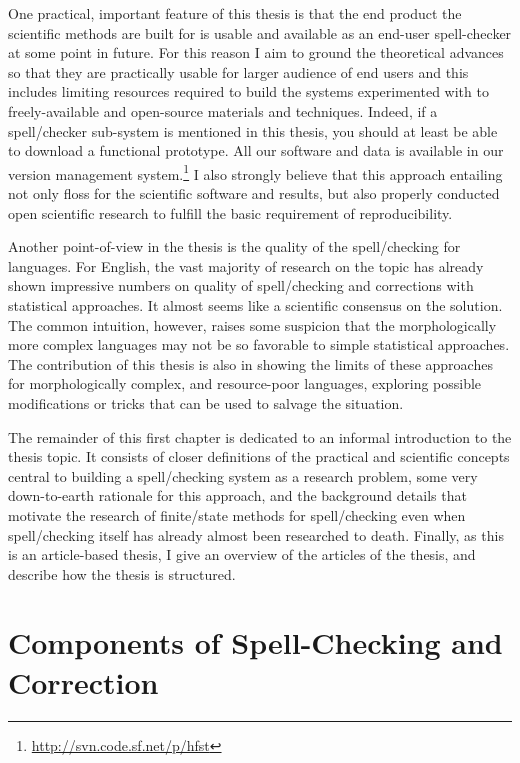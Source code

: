 \documentclass[officiallayout]{unihelcompling}
\begin{document}
One practical, important feature of this thesis is that the end product the
scientific methods are built for is usable and available as an end-user
spell-checker at some point in future. For this reason I aim to ground the
theoretical advances so that they are practically usable for larger audience of
end users and this includes limiting resources required to build the systems
experimented with to freely-available and open-source materials and techniques.
Indeed, if a spell\-/checker sub-system is mentioned in this thesis, you
should at least be able to download a functional prototype.  All our software
and data is available in our version management
system.\footnote{\url{http://svn.code.sf.net/p/hfst}} I also strongly believe
that this approach entailing not only \gls{floss} for
the scientific software and results, but also properly conducted open
scientific research to fulfill the basic requirement of reproducibility.

Another point-of-view in the thesis is the quality of the spell\-/checking for
 languages. For
English, the vast majority of research on the topic has already shown
impressive numbers on quality of spell\-/checking and corrections with
statistical approaches. It almost seems like a scientific consensus on the
solution. The common intuition, however, raises some suspicion that the
morphologically more complex languages may not be so favorable to simple
statistical approaches. The contribution of this thesis is also in showing the
limits of these approaches for morphologically complex, and resource-poor
languages, exploring possible modifications or tricks that can be used to
salvage the situation.

The remainder of this first chapter is dedicated to an informal introduction to
the thesis topic. It consists of closer definitions of the practical and
scientific concepts central to building a spell\-/checking system as a research
problem, some very down-to-earth rationale for this approach, and the
background details that motivate the research of finite\-/state methods for
spell\-/checking even when spell\-/checking itself has already almost been
researched to death. Finally, as this is an article-based thesis, I give an
overview of the articles of the thesis, and describe how the thesis is
structured.

\section{Components of Spell-Checking and Correction}
\label{sec:practical-components}
\end{document}
